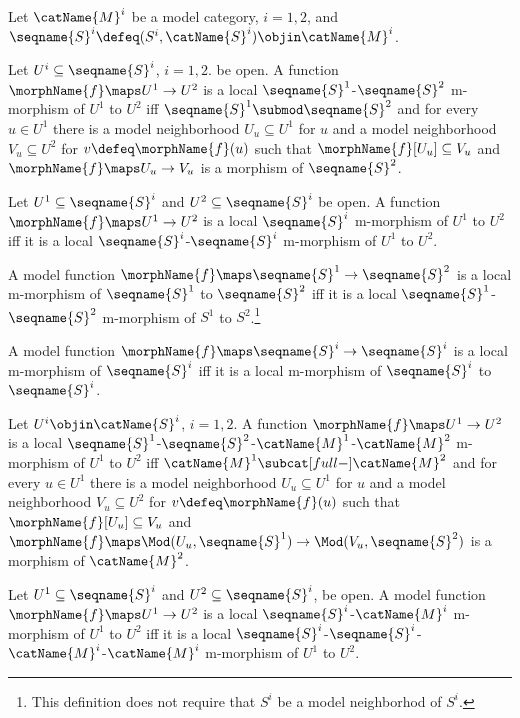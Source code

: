 \documentclass{article}
\begin{document}
\begin{definition}
\label{def:modlocalMmorph}
Let $\catName{M}^i$ be a model category, $i=1,2$, and
$\seqname{S}^i \defeq (S^i, \catName{S}^i) \objin \catName{M}^i$.

Let $U^i \subseteq \seqname{S}^i$, $i=1,2$. be open. A
function $\morphName{f} \maps U^1 \to U^2$ is a local
$\seqname{S}^1$-$\seqname{S}^2$ m-morphism of $U^1$ to $U^2$ iff
$\seqname{S}^1 \submod \seqname{S}^2$ and for every $u \in U^1$ there is
a model neighborhood $U_u \subseteq U^1$ for $u$ and a model
neighborhood $V_u \subseteq U^2$ for $v \defeq \morphName{f}(u)$ such
that $\morphName{f}[U_u] \subseteq V_u$ and
$\morphName{f} \maps U_u \to V_u$ is a morphism of $\seqname{S}^2$.

Let $U^1 \subseteq \seqname{S}^i$ and $U^2 \subseteq \seqname{S}^i$
be open.  A function
$\morphName{f} \maps U^1 \to U^2$ is a local $\seqname{S}^i$
m-morphism of $U^1$ to $U^2$ iff it is a local
$\seqname{S}^i$-$\seqname{S}^i$ m-morphism of $U^1$ to $U^2$.

A model function $\morphName{f} \maps \seqname{S}^1 \to \seqname{S}^2$ is
a local m-morphism of $\seqname{S}^1$ to $\seqname{S}^2$ iff
it is a local $\seqname{S}^1$-$\seqname{S}^2$ m-morphism of
$S^1$ to $S^2$.\footnote{
  This definition does not require that $S^i$ be a model neighborhod of
  $S^i$.
}
\setcounter{fn:nonmodel} {\value{footnote}}

A model function $\morphName{f} \maps \seqname{S}^i \to \seqname{S}^i$ is
a local m-morphism of $\seqname{S}^i$ iff it is a
local m-morphism of $\seqname{S}^i$ to $\seqname{S}^i$.

Let $U^i \objin \catName{S}^i$, $i=1,2$. A function
$\morphName{f} \maps U^1 \to U^2$ is a local
$\seqname{S}^1$-$\seqname{S}^2$-$\catName{M}^1$-$\catName{M}^2$
m-morphism of $U^1$ to $U^2$ iff
$\catName{M}^1 \subcat[full-] \catName{M}^2$ and for every $u \in U^1$
there is a model neighborhood $U_u \subseteq U^1$ for $u$ and a model
neighborhood $V_u \subseteq U^2$ for $v \defeq \morphName{f}(u)$ such
that $\morphName{f}[U_u] \subseteq V_u$ and
$
  \morphName{f} \maps \Mod(U_u,\seqname{S}^1)
  \to \Mod(V_u,\seqname{S}^2)
$
is a morphism of $\catName{M}^2$.

Let $U^1 \subseteq \seqname{S}^i$ and $U^2 \subseteq \seqname{S}^i$, be
open. A model function $\morphName{f} \maps U^1 \to U^2$ is a local
$\seqname{S}^i$-$\catName{M}^i$ m-morphism of $U^1$ to $U^2$ iff it is a
local $\seqname{S}^i$-$\seqname{S}^i$-$\catName{M}^i$-$\catName{M}^i$
m-morphism of $U^1$ to $U^2$.


\end{definition}
\end{document}
